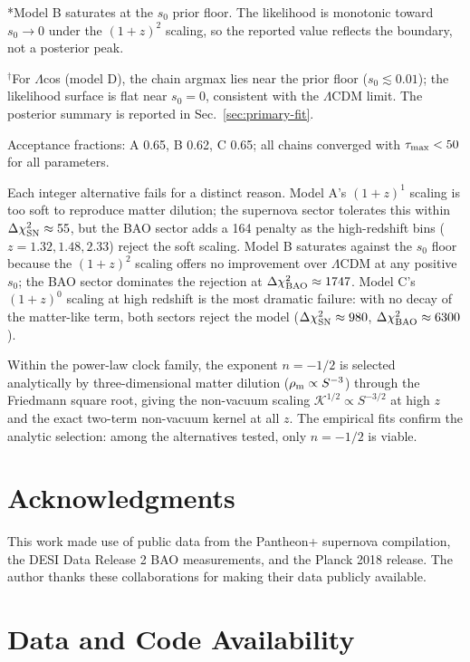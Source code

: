 \documentclass[
  aps,
  prd,
  onecolumn,         %
  nofootinbib,
  longbibliography
]{revtex4-2}
\begin{document}
*Model B saturates at the $s_0$ prior floor. The likelihood is monotonic
toward $s_0 \to 0$ under the $(1+z)^2$ scaling, so the reported value reflects
the boundary, not a posterior peak.

$^\dagger$For $\Lambda$cos (model D), the chain argmax lies near the prior floor ($s_0 \lesssim 0.01$); the likelihood surface is flat near $s_0 = 0$, consistent with the $\Lambda$CDM limit. The posterior summary is reported in Sec.~\ref{sec:primary-fit}.

Acceptance fractions: A 0.65, B 0.62, C 0.65; all chains converged with
$\tau_{\rm max} < 50$ for all parameters.

Each integer alternative fails for a distinct reason. Model A's $(1+z)^1$
scaling is too soft to reproduce matter dilution; the supernova sector
tolerates this within $\Delta\chi^2_{\rm SN} \approx 55$, but the BAO sector adds a 164
penalty as the high-redshift bins ($z = 1.32, 1.48, 2.33$) reject the soft
scaling. Model B saturates against the $s_0$ floor because the $(1+z)^2$
scaling offers no improvement over $\Lambda$CDM at any positive $s_0$; the BAO
sector dominates the rejection at $\Delta\chi^2_{\rm BAO} \approx 1747$. Model C's $(1+z)^0$
scaling at high redshift is the most dramatic failure: with no decay of
the matter-like term, both sectors reject the model ($\Delta\chi^2_{\rm SN} \approx 980$,
$\Delta\chi^2_{\rm BAO} \approx 6300$).

Within the power-law clock family, the exponent $n = -1/2$ is selected
analytically by three-dimensional matter dilution ($\rho_{\rm m} \propto S^{-3}$) through
the Friedmann square root, giving the non-vacuum scaling $\mathcal{K}^{1/2} \propto S^{-3/2}$ at
high $z$ and the exact two-term non-vacuum kernel at all $z$. The
empirical fits confirm the analytic selection: among the alternatives
tested, only $n = -1/2$ is viable.

\section*{Acknowledgments}

This work made use of public data from the Pantheon+ supernova
compilation, the DESI Data Release 2 BAO measurements, and the Planck
2018 release. The author thanks these collaborations for making their
data publicly available.

\section*{Data and Code Availability}\label{sec:data-availability}
\end{document}
